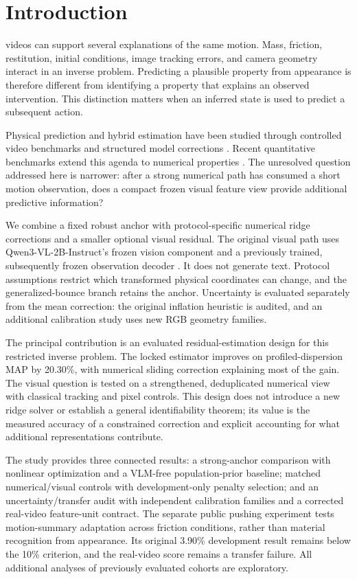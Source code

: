 \documentclass{ieeeaccess}
\begin{document}
\section{Introduction}\label{sec:introduction}
 videos can support several explanations of the same motion. Mass, friction, restitution, initial conditions, image tracking errors, and camera geometry interact in an inverse problem. Predicting a plausible property from appearance is therefore different from identifying a property that explains an observed intervention. This distinction matters when an inferred state is used to predict a subsequent action.

Physical prediction and hybrid estimation have been studied through controlled video benchmarks and structured model corrections \cite{bear2021physion,tung2023physionpp,yin2021aphynity,revach2022kalmannet}. Recent quantitative benchmarks extend this agenda to numerical properties \cite{puyin2026quantiphy,zhan2026idpp}. The unresolved question addressed here is narrower: after a strong numerical path has consumed a short motion observation, does a compact frozen visual feature view provide additional predictive information?

We combine a fixed robust anchor with protocol-specific numerical ridge corrections and a smaller optional visual residual. The original visual path uses Qwen3-VL-2B-Instruct's frozen vision component and a previously trained, subsequently frozen observation decoder \cite{bai2025qwen3vl}. It does not generate text. Protocol assumptions restrict which transformed physical coordinates can change, and the generalized-bounce branch retains the anchor. Uncertainty is evaluated separately from the mean correction: the original inflation heuristic is audited, and an additional calibration study uses new RGB geometry families.

The principal contribution is an evaluated residual-estimation design for this restricted inverse problem. The locked estimator improves on profiled-dispersion MAP by 20.30\%, with numerical sliding correction explaining most of the gain. The visual question is tested on a strengthened, deduplicated numerical view with classical tracking and pixel controls. This design does not introduce a new ridge solver or establish a general identifiability theorem; its value is the measured accuracy of a constrained correction and explicit accounting for what additional representations contribute.

The study provides three connected results: a strong-anchor comparison with nonlinear optimization and a VLM-free population-prior baseline; matched numerical/visual controls with development-only penalty selection; and an uncertainty/transfer audit with independent calibration families and a corrected real-video feature-unit contract. The separate public pushing experiment tests motion-summary adaptation across friction conditions, rather than material recognition from appearance. Its original 3.90\% development result remains below the 10\% criterion, and the real-video score remains a transfer failure. All additional analyses of previously evaluated cohorts are exploratory.
\end{document}
